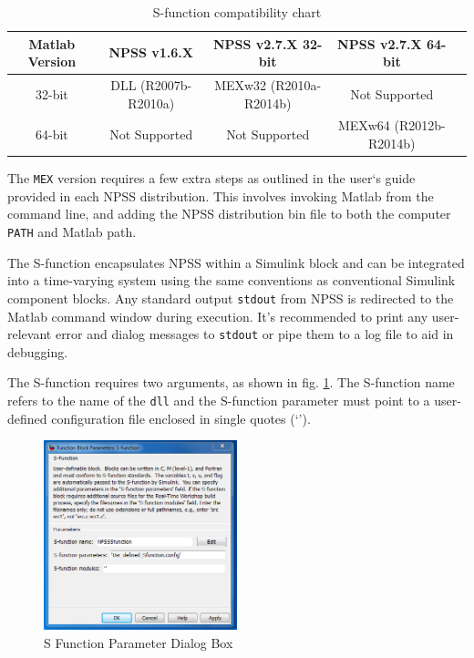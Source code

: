 \documentclass[heading.tex]{subfiles}
\begin{document}
\begin{table}[H]
\centering
\begin{adjustwidth}{-1.5cm}{-1.5cm}
\begin{tabular}{|c|c|c|c|c|}
\hline 
Matlab Version & NPSS v1.6.X & NPSS v2.7.X 32-bit & NPSS v2.7.X 64-bit\\ 
\hline \hline
32-bit & DLL (R2007b-R2010a) & MEXw32 (R2010a-R2014b) & Not Supported \\ 
\hline 
64-bit & Not Supported & Not Supported & MEXw64 (R2012b-R2014b) \\ 
\hline 
\end{tabular} 
\end{adjustwidth}
\caption{S-function compatibility chart}
\label{tab:Sfunc_Versions}
\end{table}

The \texttt{MEX} version requires a few extra steps as outlined in the user`s
guide provided in each NPSS distribution.\cite{Sfunc}
This involves invoking Matlab from the command line,
and adding the NPSS distribution bin file to both the computer
\texttt{PATH} and Matlab path.

The S-function encapsulates NPSS within a Simulink block and can be integrated into a time-varying
system using the same conventions as conventional Simulink component blocks.
Any standard output \texttt{stdout} from NPSS is redirected to the Matlab command window during execution. 
It's recommended to print any user-relevant error and dialog messages to \texttt{stdout}
or pipe them to a log file to aid in debugging.

The S-function requires two arguments, as shown in fig. \ref{f:DialogBox}.
The S-function name refers to the name of the \texttt{dll} and the S-function parameter must point
to a user-defined configuration file enclosed in single quotes (`').

\begin{figure}[H]
\centering
\includegraphics[width=0.5\textwidth]{images/SFuncDialog}
\caption{S Function Parameter Dialog Box}
\label{f:DialogBox}
\end{figure}
\end{document}

